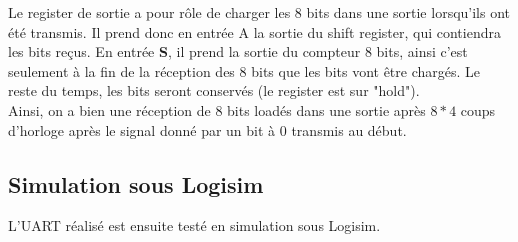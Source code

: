 \documentclass[a4paper]{article} %
\begin{document}
\begin{tcolorbox}[colframe=Monokaimagenta,colback=white]
Le register de sortie a pour rôle de charger les 8 bits dans une sortie lorsqu'ils ont été transmis. Il prend donc en entrée A la sortie du shift register, qui contiendra les bits reçus. En entrée \textbf{S}, il prend la sortie du compteur 8 bits, ainsi c'est seulement à la fin de la réception des 8 bits que les bits vont être chargés. Le reste du temps, les bits seront conservés (le register est sur "hold").\\
Ainsi, on a bien une réception de 8 bits loadés dans une sortie après $8*4$ coups d'horloge après le signal donné par un bit à $0$ transmis au début.


\end{tcolorbox}

 \subsection{Simulation sous Logisim}
L’UART réalisé est ensuite testé en simulation sous Logisim.
\end{document}
